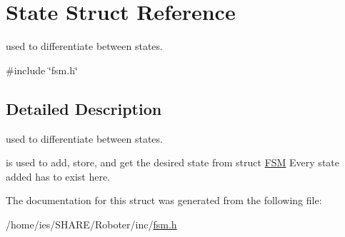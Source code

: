 \hypertarget{structState}{}\section{State Struct Reference}
\label{structState}


used to differentiate between states.  




{\ttfamily \#include \char`\"{}fsm.\+h\char`\"{}}



\subsection{Detailed Description}
used to differentiate between states. 

is used to add, store, and get the desired state from struct \hyperlink{structFSM}{F\+SM} Every state added has to exist here. 

The documentation for this struct was generated from the following file\+:\begin{DoxyCompactItemize}
\item 
/home/ies/\+S\+H\+A\+R\+E/\+Roboter/inc/\hyperlink{fsm_8h}{fsm.\+h}\end{DoxyCompactItemize}
